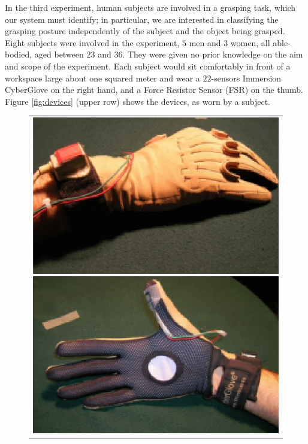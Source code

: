 In the third experiment, human subjects are involved in a grasping
task, which our system must identify; in particular, we are interested
in classifying the grasping posture independently of the subject and
the object being grasped.
Eight subjects were involved in
the experiment, $5$ men and $3$ women, all able-bodied, aged between
$23$ and $36$. They were given no prior knowledge on the aim and scope
of the experiment. Each subject would sit comfortably in front of a
workspace large about one squared meter and wear a $22$-sensors
Immersion CyberGlove \cite{cyberglove} on the right hand, and a Force
Resistor Sensor (FSR) on the thumb. Figure \ref{fig:devices} (upper
row) shows the devices, as worn by a subject.

\begin{figure}[!ht]
  \begin{center}
    \begin{tabular}{c}
      \includegraphics[height=0.08\textheight]{figs/grasping/devices1.jpg}
      \includegraphics[height=0.08\textheight]{figs/grasping/devices2.jpg}

\end{tabular}
\end{center}
\end{figure}
